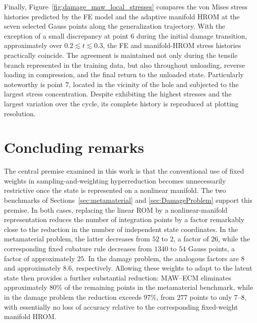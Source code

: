 \documentclass[preprint,10pt]{elsarticle}  %
\newcommand{\PROMPT}[1]{ }
\begin{document}
 Finally, Figure~\ref{fig:damage_maw_local_stresses} compares the von
Mises stress histories predicted by the FE model and the adaptive
manifold HROM at the seven selected Gauss points along the
generalization trajectory.  With the
exception of a small discrepancy at point \(6\) during the initial
damage transition, approximately over
\(0.2\lesssim t\lesssim0.3\),  the FE and manifold-HROM stress histories practically coincide.  The agreement is maintained not only
during the tensile branch represented in the training data, but also
throughout unloading, reverse loading in compression, and the final
return to the unloaded state.  Particularly noteworthy is point \(7\),
located in the vicinity of the hole and subjected to the largest stress
concentration.  Despite exhibiting the highest stresses and the
largest variation over the cycle, its complete history is reproduced
at plotting resolution.





\section{Concluding remarks}
%
% 




The central premise examined in this work is that the conventional use
of fixed weights in sampling-and-weighting hyperreduction becomes
unnecessarily restrictive once the state is represented on a nonlinear
manifold. The two benchmarks of Sections~\ref{sec:metamaterial} and
\ref{sec:DamageProblem} support this premise. In both cases, replacing
the linear ROM by a nonlinear-manifold representation reduces the
number of integration points by a factor remarkably close to the
reduction in the number of independent state coordinates. In the
metamaterial problem, the latter decreases from \(52\) to \(2\), a
factor of \(26\), while the corresponding fixed cubature rule decreases
from \(1340\) to \(54\) Gauss points, a factor of approximately \(25\).
In the damage problem, the analogous factors are \(8\) and approximately
\(8.6\), respectively.
Allowing these weights to adapt to the latent state then provides a
further substantial reduction: MAW--ECM eliminates approximately
\(80\%\) of the remaining points in the metamaterial benchmark, while
in the damage problem the reduction exceeds \(97\%\), from \(277\)
points to only \(7\)--\(8\), with essentially no loss of accuracy
relative to the corresponding fixed-weight manifold HROM.
\end{document}
